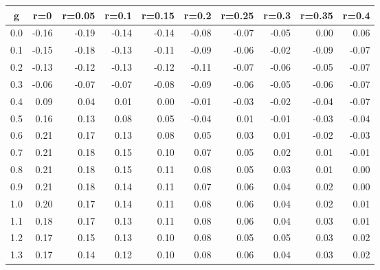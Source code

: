 %
\begin{table}[!tbp]
 \begin{center}
 \begin{tabular}{rrrrrrrrrr}\hline\hline
\multicolumn{1}{c}{g}&\multicolumn{1}{c}{r=0}&\multicolumn{1}{c}{r=0.05}&\multicolumn{1}{c}{r=0.1}&\multicolumn{1}{c}{r=0.15}&\multicolumn{1}{c}{r=0.2}&\multicolumn{1}{c}{r=0.25}&\multicolumn{1}{c}{r=0.3}&\multicolumn{1}{c}{r=0.35}&\multicolumn{1}{c}{r=0.4}\tabularnewline
\hline
0.0&-0.16&-0.19&-0.14&-0.14&-0.08&-0.07&-0.05& 0.00& 0.06\tabularnewline
0.1&-0.15&-0.18&-0.13&-0.11&-0.09&-0.06&-0.02&-0.09&-0.07\tabularnewline
0.2&-0.13&-0.12&-0.13&-0.12&-0.11&-0.07&-0.06&-0.05&-0.07\tabularnewline
0.3&-0.06&-0.07&-0.07&-0.08&-0.09&-0.06&-0.05&-0.06&-0.07\tabularnewline
0.4& 0.09& 0.04& 0.01& 0.00&-0.01&-0.03&-0.02&-0.04&-0.07\tabularnewline
0.5& 0.16& 0.13& 0.08& 0.05&-0.04& 0.01&-0.01&-0.03&-0.04\tabularnewline
0.6& 0.21& 0.17& 0.13& 0.08& 0.05& 0.03& 0.01&-0.02&-0.03\tabularnewline
0.7& 0.21& 0.18& 0.15& 0.10& 0.07& 0.05& 0.02& 0.01&-0.01\tabularnewline
0.8& 0.21& 0.18& 0.15& 0.11& 0.08& 0.05& 0.03& 0.01& 0.00\tabularnewline
0.9& 0.21& 0.18& 0.14& 0.11& 0.07& 0.06& 0.04& 0.02& 0.00\tabularnewline
1.0& 0.20& 0.17& 0.14& 0.11& 0.08& 0.06& 0.04& 0.02& 0.01\tabularnewline
1.1& 0.18& 0.17& 0.13& 0.11& 0.08& 0.06& 0.04& 0.03& 0.01\tabularnewline
1.2& 0.17& 0.15& 0.13& 0.10& 0.08& 0.05& 0.05& 0.03& 0.02\tabularnewline
1.3& 0.17& 0.14& 0.12& 0.10& 0.08& 0.06& 0.04& 0.03& 0.02\tabularnewline
\hline
\end{tabular}

\end{center}

\end{table}

